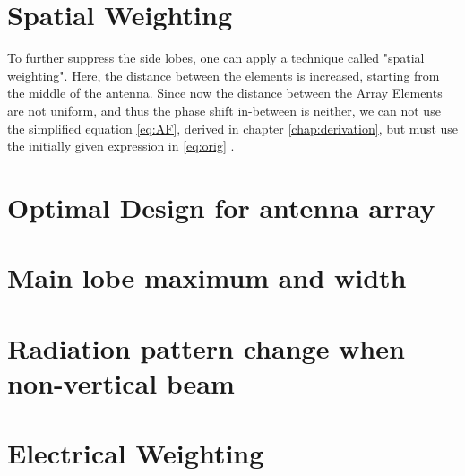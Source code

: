 \section{Spatial Weighting}
To further suppress the side lobes, one can apply a technique called "spatial weighting". Here, the distance between the elements is increased, starting from the middle of the antenna.
Since now the distance between the Array Elements are not uniform, and thus the phase shift in-between is neither, we can not use the simplified equation \ref{eq:AF}, derived in chapter \ref{chap:derivation}, but must use the initially given expression in \ref{eq:orig} \citep{roettger1989instrumental}.


\section{Optimal Design for antenna array}


\section{Main lobe maximum and width}


\section{Radiation pattern change when non-vertical beam}


\section{Electrical Weighting}
